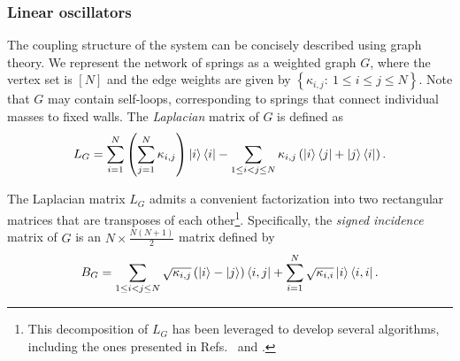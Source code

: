 \documentclass[10pt,a4paper]{amsart}
\theoremstyle{plain}
\theoremstyle{definition}
\theoremstyle{remark}
\newcommand{\lrb}[1]{\left ( #1 \right )}
\newcommand{\lrcb}[1]{\left \{ #1 \right \}}
\begin{document}
\subsubsection{Linear oscillators}
\label{subsubsec:coupled_linear_oscillators}

The coupling structure of the system can be concisely described using graph theory. We represent the network of springs as a weighted graph $G$, where the vertex set is $[N]$ and the edge weights are given by $\lrcb{\kappa_{i,j}:~1\le i\le j\le N}$. Note that $G$ may contain self-loops, corresponding to springs that connect individual masses to fixed walls. The \emph{Laplacian} matrix of $G$ is defined as
\begin{align}
L_G = \sum_{i=1}^N \lrb{\sum_{j=1}^N \kappa_{i,j}} \ket{i}\bra{i} - \sum_{1\le i<j\le N} \kappa_{i,j} \lrb{\ket{i}\bra{j}+\ket{j}\bra{i}}.
\label{eq:laplacian_matrix_def}
\end{align}

The Laplacian matrix $L_G$ admits a convenient factorization into two rectangular matrices that are transposes of each other\footnote{This decomposition of $L_G$ has been leveraged to develop several algorithms, including the ones presented in Refs.~\cite{wang2017efficient} and \cite{chakraborty2019thepower}.}. Specifically, the \emph{signed incidence} matrix of $G$ is an $N \times \frac{N(N+1)}{2}$ matrix defined by
\begin{align}
B_G = \sum_{1\le i<j\le N} \sqrt{\kappa_{i,j}} \left( \ket{i} - \ket{j} \right) \bra{i,j} + \sum_{i=1}^N \sqrt{\kappa_{i,i}}\ket{i}\bra{i,i}.
\label{eq:incidence_matrix_def}
\end{align}
\end{document}
